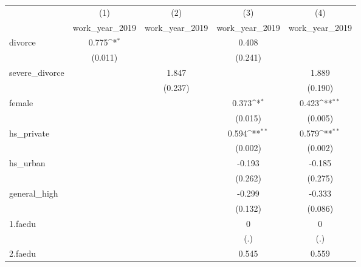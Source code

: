{
\def\sym#1{\ifmmode^{#1}\else\(^{#1}\)\fi}
\begin{tabular}{l*{4}{c}}
\hline\hline
            &\multicolumn{1}{c}{(1)}&\multicolumn{1}{c}{(2)}&\multicolumn{1}{c}{(3)}&\multicolumn{1}{c}{(4)}\\
            &\multicolumn{1}{c}{work\_year\_2019}&\multicolumn{1}{c}{work\_year\_2019}&\multicolumn{1}{c}{work\_year\_2019}&\multicolumn{1}{c}{work\_year\_2019}\\
\hline
divorce     &       0.775\sym{*}  &                     &       0.408         &                     \\
            &     (0.011)         &                     &     (0.241)         &                     \\
[1em]
severe\_divorce&                     &       1.847         &                     &       1.889         \\
            &                     &     (0.237)         &                     &     (0.190)         \\
[1em]
female      &                     &                     &       0.373\sym{*}  &       0.423\sym{**} \\
            &                     &                     &     (0.015)         &     (0.005)         \\
[1em]
hs\_private  &                     &                     &       0.594\sym{**} &       0.579\sym{**} \\
            &                     &                     &     (0.002)         &     (0.002)         \\
[1em]
hs\_urban    &                     &                     &      -0.193         &      -0.185         \\
            &                     &                     &     (0.262)         &     (0.275)         \\
[1em]
general\_high&                     &                     &      -0.299         &      -0.333         \\
            &                     &                     &     (0.132)         &     (0.086)         \\
[1em]
1.faedu     &                     &                     &           0         &           0         \\
            &                     &                     &         (.)         &         (.)         \\
[1em]
2.faedu     &                     &                     &       0.545         &       0.559         \\

\end{tabular}}

